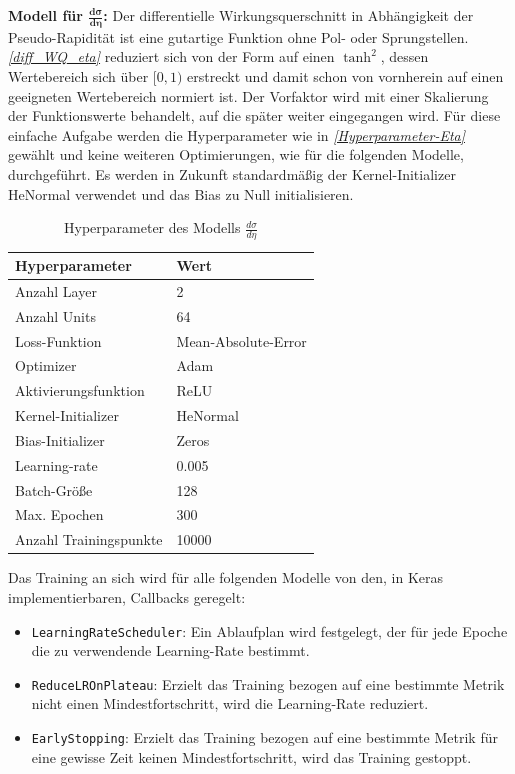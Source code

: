 \textbf{Modell für $\mathbf{\frac{d\sigma}{d\eta}}$:} 
Der differentielle Wirkungsquerschnitt in Abhängigkeit der Pseudo-Rapidität ist eine gutartige Funktion ohne Pol- oder Sprungstellen. \textit{\autoref{diff_WQ_eta}} reduziert sich von der Form auf einen $\tanh^2$, dessen Wertebereich sich über $[0,1)$ erstreckt und damit schon von vornherein auf einen geeigneten Wertebereich normiert ist. Der Vorfaktor wird mit einer Skalierung der Funktionswerte behandelt, auf die später weiter eingegangen wird. 
Für diese einfache Aufgabe werden die Hyperparameter wie in \textit{\autoref{Hyperparameter-Eta}} gewählt und keine weiteren Optimierungen, wie für die folgenden Modelle, durchgeführt. Es werden in Zukunft standardmäßig der Kernel-Initializer {HeNormal\cite{He}} verwendet und das Bias zu Null initialisieren.
\begin{table}[hbt]
	\centering
	\begin{tabular}{|l|l|}
		\hline
		Hyperparameter & Wert \\
		\hline
		Anzahl Layer & 2 \\
		Anzahl Units & 64 \\
		Loss-Funktion & Mean-Absolute-Error \\
		Optimizer & Adam \\
		Aktivierungsfunktion & ReLU \\
		Kernel-Initializer & HeNormal \\
		Bias-Initializer & Zeros \\
		Learning-rate & 0.005 \\
		Batch-Größe & 128 \\
		Max. Epochen & 300 \\
		Anzahl Trainingspunkte & 10000\\
		\hline
	\end{tabular}
	\caption{Hyperparameter des Modells $\frac{d\sigma}{d\eta}$}
	\label{Hyperparameter-Eta}
\end{table}
Das Training an sich wird für alle folgenden Modelle von den, in Keras implementierbaren, Callbacks geregelt:
\begin{itemize}
	\setlength\itemsep{0cm}
	\setlength{\parskip}{0cm}
	\item \texttt{LearningRateScheduler}: Ein Ablaufplan wird festgelegt, der für jede Epoche die zu verwendende Learning-Rate bestimmt. 
	\item \texttt{ReduceLROnPlateau}: Erzielt das Training bezogen auf eine bestimmte Metrik nicht einen Mindestfortschritt, wird die Learning-Rate reduziert.
	\item \texttt{EarlyStopping}: Erzielt das Training bezogen auf eine bestimmte Metrik für eine gewisse Zeit keinen Mindestfortschritt, wird das Training gestoppt.
\end{itemize}
